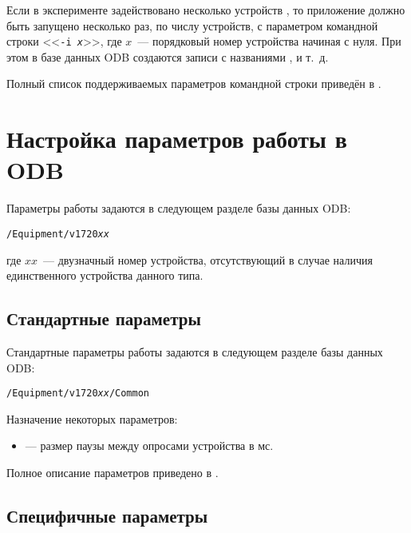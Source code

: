 Если в эксперименте задействовано несколько устройств \DEVICE{}, то приложение  должно быть запущено несколько раз, по числу устройств, с параметром командной строки <<{\tt -i {\it x}}>>, где $x$~--- порядковый номер устройства начиная с нуля. При этом в базе данных ODB создаются записи с названиями ,  и т.~д.

Полный список поддерживаемых параметров командной строки приведён в \cite{MidasWikiFrontend}. 

\section{Настройка параметров работы в ODB}

Параметры работы \DEVICE{} задаются в следующем разделе базы данных ODB:

\medskip

{\tt /Equipment/v1720{\it xx}}

\medskip

\noindent где $xx$~--- двузначный номер устройства, отсутствующий в случае наличия единственного устройства данного типа.

\subsection{Стандартные параметры}
\label{fe-v1720-common-params}

Стандартные параметры работы \DEVICE{} задаются в следующем разделе базы данных ODB:

\medskip

{\tt /Equipment/v1720{\it xx}/Common}

\medskip

Назначение некоторых параметров:

\begin{itemize}

\item 

 --- размер паузы между опросами устройства в мс.

\end{itemize}

Полное описание параметров приведено в \cite{MidasWikiEquipment}.

\subsection{Специфичные параметры}

